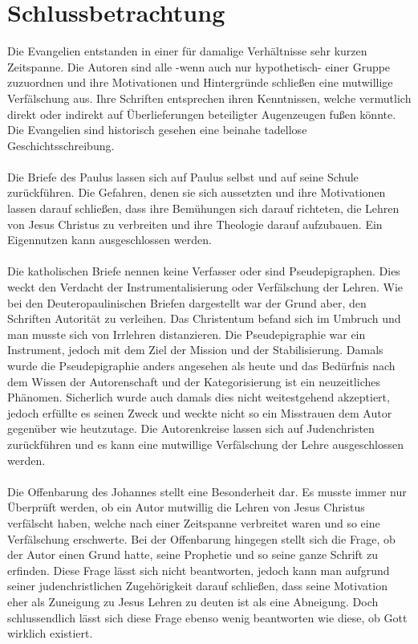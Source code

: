 \section{Schlussbetrachtung}
Die Evangelien entstanden in einer für damalige Verhältnisse sehr kurzen Zeitspanne. Die Autoren sind alle -wenn auch nur hypothetisch- einer Gruppe zuzuordnen und ihre Motivationen und Hintergründe schließen eine mutwillige Verfälschung aus. Ihre Schriften entsprechen ihren Kenntnissen, welche vermutlich direkt oder indirekt auf Überlieferungen beteiligter Augenzeugen fußen könnte. Die Evangelien sind historisch gesehen eine beinahe tadellose Geschichtsschreibung.
\\~\\
Die Briefe des Paulus lassen sich auf Paulus selbst und auf seine Schule zurückführen. Die Gefahren, denen sie sich aussetzten und ihre Motivationen lassen darauf schließen, dass ihre Bemühungen sich darauf richteten, die Lehren von Jesus Christus zu verbreiten und ihre Theologie darauf aufzubauen. Ein Eigennutzen kann ausgeschlossen werden.
\\~\\
Die katholischen Briefe nennen keine Verfasser oder sind Pseudepigraphen. Dies weckt den Verdacht der Instrumentalisierung oder Verfälschung der Lehren. Wie bei den Deuteropaulinischen Briefen dargestellt war der Grund aber, den Schriften Autorität zu verleihen. Das Christentum befand sich im Umbruch und man musste sich von Irrlehren distanzieren. Die Pseudepigraphie war ein Instrument, jedoch mit dem Ziel der Mission und der Stabilisierung. Damals wurde die Pseudepigraphie anders angesehen als heute und das Bedürfnis nach dem Wissen der Autorenschaft und der Kategorisierung ist ein neuzeitliches Phänomen. Sicherlich wurde auch damals dies nicht weitestgehend akzeptiert, jedoch erfüllte es seinen Zweck und weckte nicht so ein Misstrauen dem Autor gegenüber wie heutzutage. Die Autorenkreise lassen sich auf Judenchristen zurückführen und es kann eine mutwillige Verfälschung der Lehre ausgeschlossen werden.
\\~\\
Die Offenbarung des Johannes stellt eine Besonderheit dar. Es musste immer nur Überprüft werden, ob ein Autor mutwillig die Lehren von Jesus Christus verfälscht haben, welche nach einer Zeitspanne verbreitet waren und so eine Verfälschung erschwerte. Bei der Offenbarung hingegen stellt sich die Frage, ob der Autor einen Grund hatte, seine Prophetie und so seine ganze Schrift zu erfinden. Diese Frage lässt sich nicht beantworten, jedoch kann man aufgrund seiner judenchristlichen Zugehörigkeit darauf schließen, dass seine Motivation eher als Zuneigung zu Jesus Lehren zu deuten ist als eine Abneigung. Doch schlussendlich lässt sich diese Frage ebenso wenig beantworten wie diese, ob Gott wirklich existiert.

